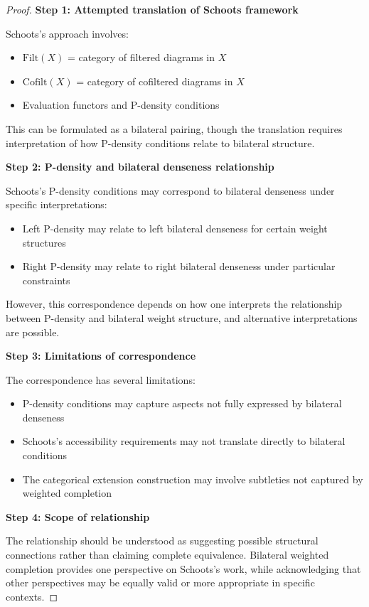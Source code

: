 \documentclass[11pt]{article}
\theoremstyle{plain}
\theoremstyle{definition}
\theoremstyle{remark}
\begin{document}
\begin{proof}
\textbf{Step 1: Attempted translation of Schoots framework}

Schoots's approach involves:
\begin{itemize}
\item $\text{Filt}(X)$ = category of filtered diagrams in $X$
\item $\text{Cofilt}(X)$ = category of cofiltered diagrams in $X$
\item Evaluation functors and P-density conditions
\end{itemize}

This can be formulated as a bilateral pairing, though the translation requires interpretation of how P-density conditions relate to bilateral structure.

\textbf{Step 2: P-density and bilateral denseness relationship}

Schoots's P-density conditions may correspond to bilateral denseness under specific interpretations:
\begin{itemize}
\item Left P-density may relate to left bilateral denseness for certain weight structures
\item Right P-density may relate to right bilateral denseness under particular constraints
\end{itemize}

However, this correspondence depends on how one interprets the relationship between P-density and bilateral weight structure, and alternative interpretations are possible.

\textbf{Step 3: Limitations of correspondence}

The correspondence has several limitations:
\begin{itemize}
\item P-density conditions may capture aspects not fully expressed by bilateral denseness
\item Schoots's accessibility requirements may not translate directly to bilateral conditions
\item The categorical extension construction may involve subtleties not captured by weighted completion
\end{itemize}

\textbf{Step 4: Scope of relationship}

The relationship should be understood as suggesting possible structural connections rather than claiming complete equivalence. Bilateral weighted completion provides one perspective on Schoots's work, while acknowledging that other perspectives may be equally valid or more appropriate in specific contexts.
\end{proof}
\end{document}
